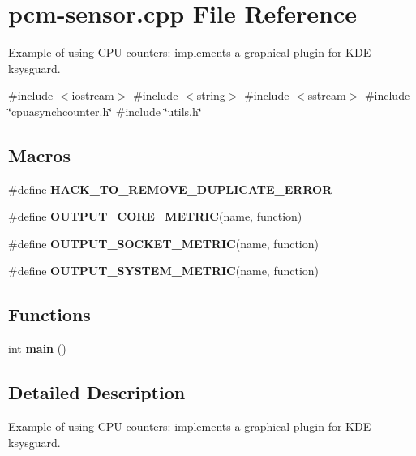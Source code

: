 \section{pcm-\/sensor.cpp File Reference}
\label{pcm-sensor_8cpp}


Example of using C\+PU counters\+: implements a graphical plugin for K\+DE ksysguard.  


{\ttfamily \#include $<$iostream$>$}\newline
{\ttfamily \#include $<$string$>$}\newline
{\ttfamily \#include $<$sstream$>$}\newline
{\ttfamily \#include \char`\"{}cpuasynchcounter.\+h\char`\"{}}\newline
{\ttfamily \#include \char`\"{}utils.\+h\char`\"{}}\newline
\subsection*{Macros}
\begin{DoxyCompactItemize}
\item 
\mbox{\label{pcm-sensor_8cpp_ac4eeb11d89b0f517835a12a04443ebe4}} 
\#define {\bfseries H\+A\+C\+K\+\_\+\+T\+O\+\_\+\+R\+E\+M\+O\+V\+E\+\_\+\+D\+U\+P\+L\+I\+C\+A\+T\+E\+\_\+\+E\+R\+R\+OR}
\item 
\#define {\bfseries O\+U\+T\+P\+U\+T\+\_\+\+C\+O\+R\+E\+\_\+\+M\+E\+T\+R\+IC}(name,  function)
\item 
\#define {\bfseries O\+U\+T\+P\+U\+T\+\_\+\+S\+O\+C\+K\+E\+T\+\_\+\+M\+E\+T\+R\+IC}(name,  function)
\item 
\#define {\bfseries O\+U\+T\+P\+U\+T\+\_\+\+S\+Y\+S\+T\+E\+M\+\_\+\+M\+E\+T\+R\+IC}(name,  function)
\end{DoxyCompactItemize}
\subsection*{Functions}
\begin{DoxyCompactItemize}
\item 
\mbox{\label{pcm-sensor_8cpp_ae66f6b31b5ad750f1fe042a706a4e3d4}} 
int {\bfseries main} ()
\end{DoxyCompactItemize}


\subsection{Detailed Description}
Example of using C\+PU counters\+: implements a graphical plugin for K\+DE ksysguard. 



